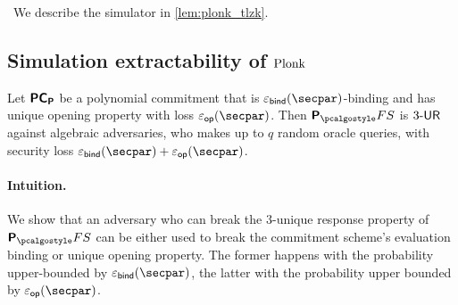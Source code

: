 \ 
We describe the simulator in \cref{lem:plonk_tlzk}.

\subsection{Simulation extractability of $\textnormal{{Plonk}}${}}

\begin{lemma}
	\label{lem:plonkprot_ur}
	Let $\bm{\mathsf{PC}}_{\bm{\mathsf{P}}}$ be a polynomial commitment that is $\epsbind(\secpar)$-binding and has unique opening property with loss $\epsop (\secpar)$. Then $\plonkprotfs$ is ${3\text{-}\mathsf{UR}}$ against algebraic adversaries, who makes up to $q$ random oracle queries, with security loss $\epsbinding (\secpar) + \epsop ( \secpar )$.
\end{lemma}
\paragraph{Intuition.} We show that an adversary who can break the $3$-unique response property of $\plonkprotfs$ can be either used to break the commitment scheme's evaluation binding or unique opening property. The former happens with the probability upper-bounded by $\epsbinding (\secpar)$, the latter with the probability upper bounded by $\epsop (\secpar)$. 

